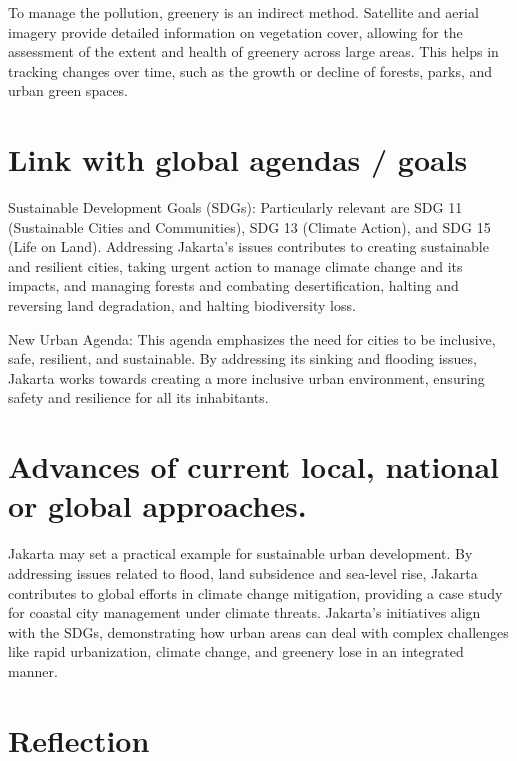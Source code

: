 \documentclass[
  letterpaper,
  DIV=11,
  numbers=noendperiod]{scrreprt}
\begin{document}
To manage the pollution, greenery is an indirect method. Satellite and
aerial imagery provide detailed information on vegetation cover,
allowing for the assessment of the extent and health of greenery across
large areas. This helps in tracking changes over time, such as the
growth or decline of forests, parks, and urban green spaces.


\chapter{Link with global agendas /
goals}\label{link-with-global-agendas-goals}

Sustainable Development Goals (SDGs): Particularly relevant are SDG 11
(Sustainable Cities and Communities), SDG 13 (Climate Action), and SDG
15 (Life on Land). Addressing Jakarta's issues contributes to creating
sustainable and resilient cities, taking urgent action to manage climate
change and its impacts, and managing forests and combating
desertification, halting and reversing land degradation, and halting
biodiversity loss.

New Urban Agenda: This agenda emphasizes the need for cities to be
inclusive, safe, resilient, and sustainable. By addressing its sinking
and flooding issues, Jakarta works towards creating a more inclusive
urban environment, ensuring safety and resilience for all its
inhabitants.


\chapter{Advances of current local, national or global
approaches.}\label{advances-of-current-local-national-or-global-approaches.}

Jakarta may set a practical example for sustainable urban development.
By addressing issues related to flood, land subsidence and sea-level
rise, Jakarta contributes to global efforts in climate change
mitigation, providing a case study for coastal city management under
climate threats. Jakarta's initiatives align with the SDGs,
demonstrating how urban areas can deal with complex challenges like
rapid urbanization, climate change, and greenery lose in an integrated
manner.


\chapter{Reflection}\label{reflection-2}
\end{document}
